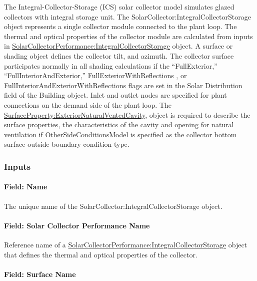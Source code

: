 The Integral-Collector-Storage (ICS) solar collector model simulates glazed collectors with integral storage unit. The SolarCollector:IntegralCollectorStorage object represents a single collector module connected to the plant loop. The thermal and optical properties of the collector module are calculated from inputs in \hyperref[solarcollectorperformanceintegralcollectorstorage]{SolarCollectorPerformance:IntegralCollectorStorage} object. A surface or shading object defines the collector tilt, and azimuth. The collector surface participates normally in all shading calculations if the ``FullExterior,'' ``FullInteriorAndExterior,'' FullExteriorWithReflections , or FullInteriorAndExteriorWithReflections flags are set in the Solar Distribution field of the Building object. Inlet and outlet nodes are specified for plant connections on the demand side of the plant loop. The \hyperref[surfacepropertyexteriornaturalventedcavity]{SurfaceProperty:ExteriorNaturalVentedCavity}, object is required to describe the surface properties, the characteristics of the cavity and opening for natural ventilation if OtherSideConditionsModel is specified as the collector bottom surface outside boundary condition type.

\subsubsection{Inputs}\label{inputs-2-039}

\paragraph{Field: Name}\label{field-name-2-036}

The unique name of the SolarCollector:IntegralCollectorStorage object.

\paragraph{Field: Solar Collector Performance Name}\label{field-solar-collector-performance-name-1}

Reference name of a \hyperref[solarcollectorperformanceintegralcollectorstorage]{SolarCollectorPerformance:IntegralCollectorStorage} object that defines the thermal and optical properties of the collector.

\paragraph{Field: Surface Name}\label{field-surface-name-1-001}

